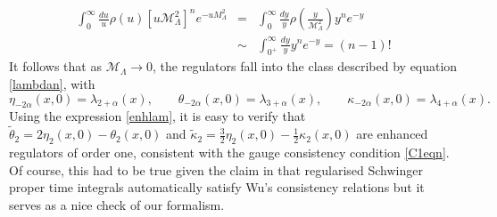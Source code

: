 \documentclass[12pt, letter]{article}
\def\be{\begin{equation}}
\def\ee{\end{equation}}
\newcommand{\M}{\mathcal{M}}
\begin{document}
\begin{eqnarray}
\int_0^\infty  \frac{du}{u} \rho(u) [u\M_\Lambda^2]^{n} e^{-u M_\Lambda^2} &=& \int_0^\infty  \frac{dy}{y} \rho\left(\frac{y}{\M_\Lambda^2}\right) y^{n} e^{-y} \\
&\sim & \int_{0^+}^\infty  \frac{dy}{y}  y^{n} e^{-y} =(n-1)!
\end{eqnarray}
It follows that as $\M_\Lambda \to 0$, the regulators fall into the class described by equation \eqref{lambdan}, with
\be \label{SPTregs}
\eta_{-2\alpha}(x, 0)=\lambda_{2+\alpha}(x), \qquad \theta_{-2\alpha}(x, 0)=\lambda_{3+\alpha}(x), \qquad \kappa_{-2\alpha}(x, 0)=\lambda_{4+\alpha}(x).
\ee
Using the expression \eqref{enhlam}, it is easy to verify that  $\tilde \theta_2=2\eta_{2}(x, 0)-\theta_{2}(x, 0)$  and  $\tilde \kappa_2=\frac32\eta_{2}(x, 0)-\frac12\kappa_{2}(x, 0)$ are enhanced regulators of order one, consistent with the gauge consistency condition \eqref{C1eqn}.  Of course,  this had to be true given the claim in \cite{Xing:2022jtt} that regularised Schwinger proper time integrals automatically satisfy Wu's consistency relations but it serves as a nice check of our formalism.
\end{document}
